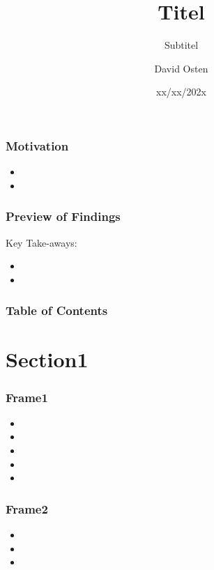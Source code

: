 \documentclass[xcolor={usenames,dvipsnames}, 
	hyperref={
	colorlinks=false, 						%
	linkcolor=black, 						%
	urlcolor=black,							%
	citecolor=black,						%
	pdfpagelabels=false,
	},
	ignorenonframetext,			%
	compress,					%
	aspectratio=169
]{beamer}
\title{Titel}
\subtitle[Optional Subtitle]{Subtitel}
\author{David Osten}
\institute{Topic/Lecture Series}
\date{xx/xx/202x}
\begin{document}
\begin{frame}  %
	\titlepage
\end{frame}
	
\addtocounter{framenumber}{-1} %







\begin{frame}
	\frametitle{Motivation}
	\begin{itemize}
		\item 
		\item 
	\end{itemize}
\end{frame}

\begin{frame}
	\frametitle{Preview of Findings}
	Key Take-aways:
	\begin{itemize}
		\item 
		\item 
	\end{itemize}
\end{frame}

\begin{frame}
	\frametitle{Table of Contents}
	\tableofcontents
\end{frame}


\section{Section1}
\begin{frame}
	\frametitle{Frame1}
	\begin{itemize}
	\item 
	\item 
	\item
	\item 
	\item 
\end{itemize}

\end{frame}


\begin{frame}
\frametitle{Frame2}

\begin{itemize}
	\item 
	\item
	\item 
\end{itemize}

\end{frame}
\end{document}
